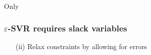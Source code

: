 \begin{frame}{Only}\frametitle{$\varepsilon$-SVR requires slack variables}

\slidesonly{\vspace{-3mm}}

\begin{figure}[h]
     \centering
     \begin{subfigure}[t]{0.35\textwidth}
         \centering
         \usebox{\imagebox}%
         \label{fig:violate_within_margin}
     \end{subfigure}
     \begin{subfigure}[t]{0.35\textwidth}
         \centering
     \end{subfigure}
	 \label{fig:relaxed}
\end{figure}

\slidesonly{\vspace{-5mm}}

\begin{itemize}
\item[(ii)]
Relax constraints by allowing for errors\\



\end{itemize}
\end{frame}
